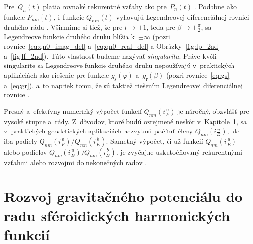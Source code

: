 \documentclass[a4paper, 12pt]{book}
\begin{document}
Pre~$Q_n(t)$ platia rovnaké rekurentné vzťahy ako pre~$P_n(t)$ 
\parencite{MoritzPhysicalGeodesy}.  Podobne ako funkcie $P_{nm}(t)$, i~funkcie 
$Q_{nm}(t)$ vyhovujú Legendreovej diferenciálnej rovnici druhého rádu 
\parencite[pozri rovnicu
\ref{eq:legfunc1_differential_equation};][]{MoritzPhysicalGeodesy}.  Všimnime 
si tiež, že pre $t \rightarrow \pm 1$, teda pre $\beta \rightarrow \pm 
\frac{\pi}{2}$, sa Legendreove funkcie druhého druhu blížia k~$\pm \infty$ 
(pozri rovnice~\ref{eq:qn0_imag_def} a~\ref{eq:qn0_real_def} 
a Obrázky~\ref{fig:lp_2nd} a~\ref{fig:lf_2nd}).  Túto vlastnosť budeme nazývať 
\emph{singularita}.  Práve kvôli singularite sa Legendreove funkcie druhého 
druhu nepoužívajú v~praktických aplikáciách ako riešenie pre funkcie 
$g_\mathrm{s}(\varphi)$ a~$g_\mathrm{r}(\beta)$ (pozri rovnice~\ref{eq:gs} 
a~\ref{eq:gr}), a~to napriek tomu, že sú taktiež riešením Legendreovej 
diferenciálnej rovnice \parencite{MoritzPhysicalGeodesy}.

Presný a~efektívny numerický výpočet funkcií $Q_{nm}\left( i \frac{u}{E} 
\right)$ je náročný, obzvlášť pre vysoké stupne a~rády.  Z~dôvodov, ktoré budú 
ozrejmené neskôr v~Kapitole~\ref{sec:spheroidal_harmonic_expansion}, sa 
v~praktických geodetických aplikáciách nezvyknú počítať členy $Q_{nm}\left( 
i \frac{u}{E} \right)$, ale iba podiely $Q_{nm}\left( i \frac{u}{E} \right) 
\slash Q_{nm}\left( i \frac{b}{E} \right)$.  Samotný výpočet, či už funkcií 
$Q_{nm}\left( i \frac{u}{E} \right)$ alebo podielov $Q_{nm}\left( i \frac{u}{E} 
\right) \slash Q_{nm}\left( i \frac{b}{E} \right)$, je zvyčajne uskutočňovaný 
rekurentnými vzťahmi alebo rozvojmi do nekonečných radov \parencite[pozri 
napríklad][]{Sebera2012,Fukushima2013,Wang2013,Sprlak2020}.



\section{Rozvoj gravitačného potenciálu do radu sféroidických harmonických 
funkcií}
\label{sec:spheroidal_harmonic_expansion}
\end{document}
